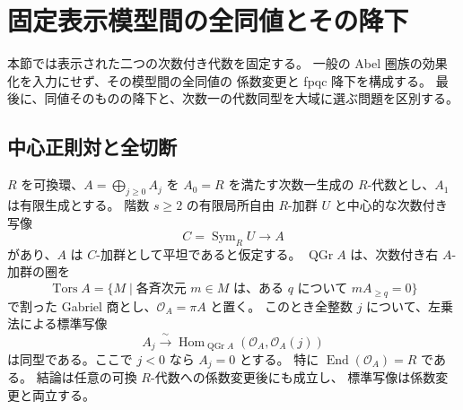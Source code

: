 \section{固定表示模型間の全同値とその降下}
\label{sec:nfm-fixed-model-descent}

本節では表示された二つの次数付き代数を固定する。
一般の Abel 圏族の効果化を入力にせず、その模型間の全同値の
係数変更と fpqc 降下を構成する。
最後に、同値そのものの降下と、次数一の代数同型を大域に選ぶ問題を区別する。

\subsection{中心正則対と全切断}

\begin{lemma}[中心正則対による全次数の切断飽和性]
\label{lem:nfm-central-saturation}
$R$ を可換環、$A=\bigoplus_{j\geq0}A_j$ を
$A_0=R$ を満たす次数一生成の $R$-代数とし、$A_1$ は有限生成とする。
階数 $s\geq2$ の有限局所自由 $R$-加群 $U$ と中心的な次数付き写像
\[
 C=\operatorname{Sym}_R U\longrightarrow A
\]
があり、$A$ は $C$-加群として平坦であると仮定する。
$\operatorname{QGr}A$ は、次数付き右 $A$-加群の圏を
\[
 \operatorname{Tors}A
 =\{M\mid \text{各斉次元 }m\in M\text{ は、ある }q
       \text{ について }mA_{\geq q}=0\}
\]
で割った Gabriel 商とし、$\mathcal O_A=\pi A$ と置く。
このとき全整数 $j$ について、左乗法による標準写像
\begin{equation}
\label{eq:nfm-central-saturation}
 A_j\xrightarrow{\ \sim\ }
 \operatorname{Hom}_{\operatorname{QGr}A}
     (\mathcal O_A,\mathcal O_A(j))
\end{equation}
は同型である。ここで $j<0$ なら $A_j=0$ とする。
特に $\operatorname{End}(\mathcal O_A)=R$ である。
結論は任意の可換 $R$-代数への係数変更後にも成立し、
標準写像は係数変更と両立する。
\end{lemma}

